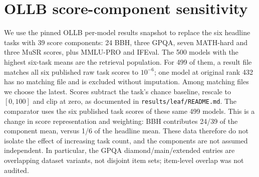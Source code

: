 \documentclass{article}
\begin{document}
\begin{table}[ht]
\centering
\caption{Wider OLLB ordinal coverage: feasible counts out of 15 targets per rank stratum and out of 60 overall. The final column separates cap-screen infeasibility from solver-limit censoring. Neither rule has any censored instance or already-first target. The oracle cap allows scores up to 100. Generated by \texttt{figures/src/tables.py}.}
\label{tab:ordstatus}

\end{table}

\begin{table}[ht]
\centering
\caption{Paired ordinal costs on the same 60-target sample. Rule and mean feasibility counts precede the number feasible under both, which is the denominator for the median per-target cost ratios and their 95\% target-bootstrap intervals (1000 draws, seed 0). These selected pairs are 35 targets for Borda and 13 for Condorcet under \texttt{emp99}; ratios do not summarise infeasible targets. Generated by \texttt{figures/src/tables.py}.}
\label{tab:ordpaired}

\end{table}

\clearpage
\section{OLLB score-component sensitivity}
\label{app:components}
We use the pinned OLLB per-model results snapshot to replace the six headline tasks with 39 score components: 24 BBH, three GPQA, seven MATH-hard and three MuSR scores, plus MMLU-PRO and IFEval. The 500 models with the highest six-task means are the retrieval population. For 499 of them, a result file matches all six published raw task scores to $10^{-6}$; one model at original rank 432 has no matching file and is excluded without imputation. Among matching files we choose the latest. Scores subtract the task's chance baseline, rescale to $[0,100]$ and clip at zero, as documented in \texttt{results/leaf/README.md}. The comparator uses the six published task scores of these same 499 models. This is a change in score representation and weighting: BBH contributes 24/39 of the component mean, versus 1/6 of the headline mean. These data therefore do not isolate the effect of increasing task count, and the components are not assumed independent. In particular, the GPQA diamond/main/extended entries are overlapping dataset variants, not disjoint item sets; item-level overlap was not audited.
\end{document}
